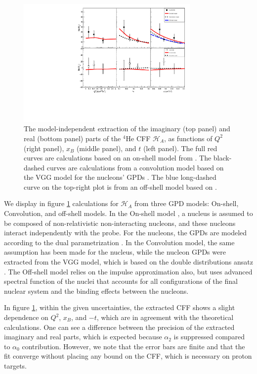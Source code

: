\documentclass[nofootinbib,twocolumn,showpacs,prl,superscriptaddress,secnumarabic,amssymb,nobibnotes,aps,floatfix]{revtex4}
\begin{document}
\begin{figure}[tb]
\includegraphics[width=8.9cm]{figs/Coherent_CFF.pdf}
\caption{The model-independent extraction of the imaginary (top panel) and
real (bottom panel) parts of the $^4$He CFF $\mathcal{H}_A$, as functions of
$Q^{2}$ (right panel), $x_B$ (middle panel), and $t$ (left panel). The full red 
curves are calculations based on an on-shell model from
\cite{Vadim_priv}. The black-dashed curves are calculations from a convolution 
model based on the VGG model for the nucleons' GPDs \cite{Guidal_priv}. The 
blue long-dashed curve on the top-right plot is from
an off-shell model based on \cite{GonzalezHernandez:2012jv}.}
\label{fig:CFF_HA}
\end{figure}

We display in figure \ref{fig:CFF_HA} calculations for $\mathcal{H}_A$ from 
three GPD models: On-shell, Convolution, and off-shell models. In the On-shell 
model \cite{Vadim_priv}, a nucleus is assumed to be composed of 
non-relativistic non-interacting nucleons, and these nucleons interact 
independently with the probe. For the nucleons, the GPDs are modeled according 
to the dual parametrization \cite{Guzey:2006xi}. In the Convolution model, the 
same assumption has been made for the nucleus, while the nucleon GPDs were 
extracted from the VGG model, which is based on the double distributions ansatz 
\cite{DD_model}. The Off-shell model \cite{GonzalezHernandez:2012jv} relies on 
the impulse approximation also, but uses advanced spectral function of the 
nuclei that accounts for all configurations of the final nuclear system and the 
binding effects between the nucleons.

In figure \ref{fig:CFF_HA}, within the given uncertainties, the extracted CFF 
shows a slight dependence on $Q^{2}$, $x_B$, and $-t$, which are in agreement 
with the theoretical calculations. One can see a difference between the 
precision of the extracted imaginary and real parts, which is expected because 
$\alpha_2$ is suppressed compared to $\alpha_0$ contribution. However, we note 
that the error bars are finite and that the fit converge without placing any 
bound on the CFF, which is necessary on proton targets.
\end{document}
